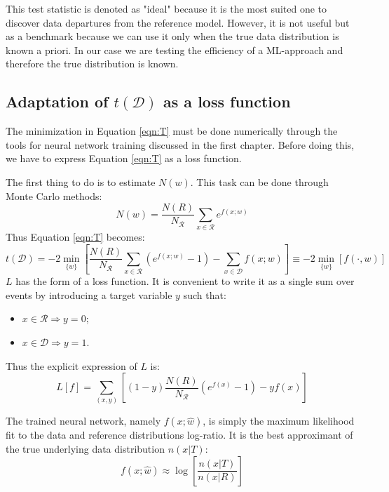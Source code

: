 This test statistic is denoted as "ideal" because it is the most suited one to discover data departures from the reference model. However, it is not useful but as a benchmark because we can use it only when the true data distribution is known a priori. In our case we are testing the efficiency of a ML-approach and therefore the true distribution is known.



\subsection{Adaptation of $t(\mathcal{D})$ as a loss function}
The minimization in Equation \ref{eqn:T} must be done numerically through the tools for neural network training discussed in the first chapter. Before doing this, we have to express Equation \ref{eqn:T} as a loss function.

The first thing to do is to estimate $N(w)$. This task can be done through Monte Carlo methods:
\begin{equation}
	N(w) = \frac{N(R)}{N_{\mathcal{R}}} \sum_{x \in \mathcal{R}} e^{f(x;w)}
\end{equation}
Thus Equation \ref{eqn:T} becomes:
\begin{equation}
	t(\mathcal{D}) = -2 \min_{\{w\}}{\left[
	\frac{N(R)}{N_{\mathcal{R}}} \sum_{x \in \mathcal{R}} (e^{f(x;w)} -1) -
	\sum_{x \in \mathcal{D}} f(x;w)
	\right]}
	\equiv
	-2 \min_{\{w\}}{\left[ f(\cdot,w) \right]}
\end{equation}
$L$ has the form of a loss function. It is convenient to write it as a single sum over events by introducing a target variable $y$ such that:
\begin{itemize}
	\item $x \in \mathcal{R} \Longrightarrow y=0$;
	\item $x \in \mathcal{D} \Longrightarrow y=1$.
\end{itemize}
Thus the explicit expression of $L$ is:
\begin{equation}
	L[f] = \sum_{(x,y)} \left[
	(1-y) \frac{N(R)}{N_{\mathcal{R}}} (e^{f(x)} - 1) - yf(x)
	\right]
\end{equation}

The trained neural network, namely $f(x;\hat{w})$, is simply the maximum likelihood fit to the data and reference distributions log-ratio. It is the best approximant of the true underlying data distribution $n(x|T)$:
\begin{equation}
	f(x;\hat{w}) \approx \log{ \left[
	\frac{n(x|T)}{n(x|R)}
	\right] }
\end{equation}


